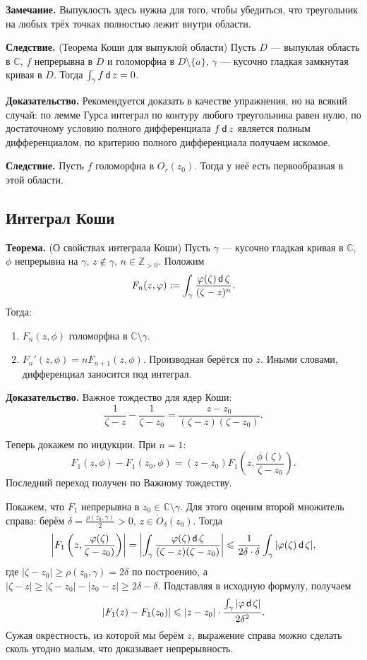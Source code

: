 \QED

\textbf{Замечание.} Выпуклость здесь нужна для того, чтобы убедиться, что треугольник на любых трёх точках полностью лежит внутри области.

\textbf{Следствие.} (Теорема Коши для выпуклой области)
Пусть $D$ --- выпуклая область в $\mathbb C$, $f$ непрерывна в $D$ и голоморфна в $D \setminus \{a\}$, $\gamma$ --- кусочно гладкая замкнутая кривая в $D$.
Тогда $\int_\gamma f \operatorname{\mathsf d} z = 0$.

\textbf{Доказательство.} Рекомендуется доказать в качестве упражнения, но на всякий случай: по лемме Гурса интеграл по контуру любого треугольника равен нулю, по достаточному условию полного дифференциала $f \operatorname{\mathsf d} z$ является полным дифференциалом, по критерию полного дифференциала получаем искомое.

\QED

\textbf{Следствие.} Пусть $f$ голоморфна в $O_r(z_0)$.
Тогда у неё есть первообразная в этой области.

\subsection{Интеграл Коши}
\textbf{Теорема.} (О свойствах интеграла Коши)
Пусть $\gamma$ --- кусочно гладкая кривая в $\mathbb C$, $\phi$ непрерывна на $\gamma$, $z \not\in \gamma$, $n \in \mathbb Z_{>0}$.
Положим
\[
    F_n(z, \varphi) := \int_\gamma \frac{\varphi(\zeta) \operatorname{\mathsf d} \zeta}{(\zeta - z)^n}.
\]
Тогда:
\begin{enumerate}
    \item $F_n(z, \phi)$ голоморфна в $\mathbb C \setminus \gamma$.
    \item $F_n'(z, \phi) = nF_{n+1}(z, \phi)$. Производная берётся по $z$.
        Иными словами, дифференциал заносится под интеграл.
\end{enumerate}

\textbf{Доказательство.} Важное тождество для ядер Коши:
\[
    \frac{1}{\zeta - z} - \frac{1}{\zeta - z_0} = \frac{z - z_0}{(\zeta - z)(\zeta - z_0)}.
\]

Теперь докажем по индукции. При $n = 1$:
\[
    F_1(z, \phi) - F_1(z_0, \phi) = (z - z_0) F_1 \left(z, \frac{\phi(\zeta)}{\zeta - z_0} \right).
\]
Последний переход получен по Важному тождеству.

Покажем, что $F_1$ непрерывна в $z_0 \in \mathbb C \setminus \gamma$.
Для этого оценим второй множитель справа: берём $\delta = \frac{\rho(z_0, \gamma)}{2} > 0$, $z \in \dot O_\delta(z_0)$.
Тогда
\[
    \left| F_1 \left(z, \frac{\varphi(\zeta)}{\zeta - z_0)} \right) \right| = \left| \int_\gamma \frac{\varphi(\zeta) \operatorname{\mathsf d} \zeta}{(\zeta - z)(\zeta - z_0)} \right| \leqslant \frac{1}{2 \delta \cdot \delta} \int_\gamma |\varphi(\zeta) \operatorname{\mathsf d} \zeta|,
\]
где $|\zeta - z_0| \ge \rho(z_0, \gamma) = 2\delta$ по построению, а $|\zeta - z| \ge |\zeta - z_0| - |z_0 - z| \ge 2\delta - \delta$.
Подставляя в исходную формулу, получаем
\[
    |F_1(z) - F_1(z_0)| \leqslant |z - z_0| \cdot \frac{\int_\gamma |\varphi \operatorname{\mathsf d} \zeta|}{2 \delta^2}.
\]
Сужая окрестность, из которой мы берём $z$, выражение справа можно сделать сколь угодно малым, что доказывает непрерывность.

